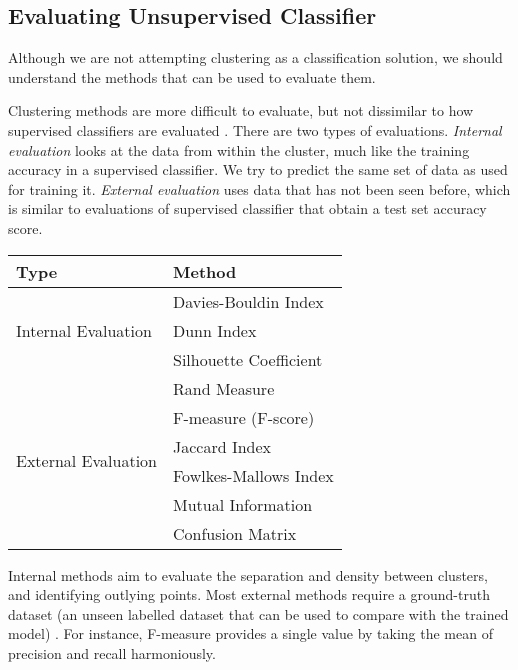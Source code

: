 \subsection{Evaluating Unsupervised Classifier}
Although we are not attempting clustering as a classification solution, we should understand the methods that can be used to evaluate them.

Clustering methods are more difficult to evaluate, but not dissimilar to how supervised classifiers are evaluated \cite{mur-book}. There are two types of evaluations. \textit{Internal evaluation } looks at the data from within the cluster, much like the training accuracy in a supervised classifier. We try to predict the same set of data as used for training it. \textit{External evaluation} uses data that has not been seen before, which is similar to evaluations of supervised classifier that obtain a test set accuracy score.

\vspace{15pt}
\parbox{\linewidth}{
  \centering
  \begin{tabular}{|m{}|m{}|}
    \hline
    \multicolumn{1}{|M{0.28\textwidth}|}{\textbf{Type}} & \multicolumn{1}{M{0.28\textwidth}|}{\textbf{Method}}
    \\\hline
    \multirow{3}{*}{Internal Evaluation} & Davies-Bouldin Index
    \\ & Dunn Index
    \\ & Silhouette Coefficient
    \\\hline
    \multirow{6}{*}{External Evaluation} & Rand Measure
    \\ & F-measure (F-score)
    \\ & Jaccard Index
    \\ & Fowlkes-Mallows Index
    \\ & Mutual Information
    \\ & Confusion Matrix
    \\\hline
  \end{tabular}

  \label{tab:unsupervised-eval}
}
\vspace{15pt}

Internal methods aim to evaluate the separation and density between clusters, and identifying outlying points. Most external methods require a ground-truth dataset (an unseen labelled dataset that can be used to compare with the trained model) \cite{cluster-label}. For instance, F-measure provides a single value by taking the mean of precision and recall harmoniously. 

